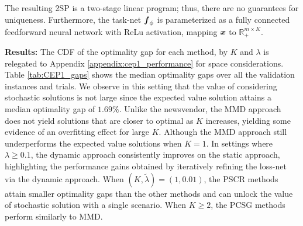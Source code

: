 The resulting 2SP is a two-stage linear program; thus, there are no guarantees for uniqueness. Furthermore, the task-net $\boldsymbol{f}_{\phi}$ is parameterized as a fully connected feedforward neural network with ReLu activation, mapping $\boldsymbol{x}$ to $\mathbb{R}_{+}^{m \times K}$.  

\vspace{\littlespace}
\noindent \textbf{Results:} The CDF of the optimality gap for each method, by $K$ and $\lambda$ is relegated to Appendix \ref{appendix:cep1_performance} for space considerations. Table \ref{tab:CEP1_gaps} shows the median optimality gaps over all the validation instances and trials. We observe in this setting that the value of considering stochastic solutions is not large since the expected value solution attains a median optimality gap of $1.69\%$. Unlike the newsvendor, the MMD approach does not yield solutions that are closer to optimal as $K$ increases, yielding some evidence of an overfitting effect for large $K$. Although the MMD approach still underperforms the expected value solutions when $K = 1$. In settings where $\lambda \geq 0.1$, the dynamic approach consistently improves on the static approach, highlighting the performance gains obtained by iteratively refining the loss-net via the dynamic approach. When $(K, \tilde{\lambda}) = (1, 0.01)$, the PSCR methods attain smaller optimality gaps than the other methods and can unlock the value of stochastic solution with a single scenario. When $K \geq 2$, the PCSG methods perform similarly to MMD. 



